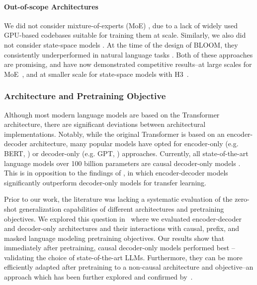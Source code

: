 \documentclass[twoside,11pt]{article}
\begin{document}
\paragraph{Out-of-scope Architectures}
We did not consider mixture-of-experts (MoE) \citep{shazeer2017}, due to a lack of widely used GPU-based codebases suitable for training them at scale. Similarly, we also did not consider state-space models \citep{gu2020hippo}. At the time of the design of BLOOM, they consistently underperformed in natural language tasks \citep{gu2021efficiently}. Both of these approaches are promising, and have now demonstrated competitive results--at large scales for MoE~\citep{fedus2022switch, srivastava2022beyond}, and at smaller scale for state-space models with H3~\citep{fu2023hungry}. 

\subsubsection{Architecture and Pretraining Objective}

Although most modern language models are based on the Transformer architecture, there are significant deviations between architectural implementations. Notably, while the original Transformer is based on an encoder-decoder architecture, many popular models have opted for encoder-only (e.g. BERT, \citep{devlin2019bert}) or decoder-only (e.g. GPT, \citep{radford2018improving}) approaches. Currently, all state-of-the-art language models over 100 billion parameters are causal decoder-only models \citep{brown2020language, rae2021scaling, chowdhery2022palm}. 
This is in opposition to the findings of \citet{raffel2020exploring}, in which encoder-decoder models significantly outperform decoder-only models for transfer learning.

Prior to our work, the literature was lacking a systematic evaluation of the zero-shot generalization capabilities of different architectures and pretraining objectives. 
We explored this question in~\citet{wang2022what} where we evaluated encoder-decoder and
decoder-only architectures and their interactions with causal, prefix, and masked language modeling pretraining objectives. 
Our results show that immediately after pretraining, causal decoder-only models performed best -- validating the choice of state-of-the-art LLMs. Furthermore, they can be more efficiently adapted after pretraining to a non-causal architecture and objective--an approach which has been further explored and confirmed by~\citet{tay2022transcending}.
\end{document}
